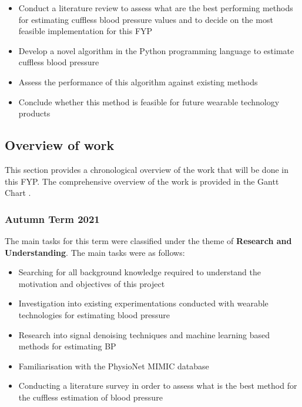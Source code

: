 \begin{itemize}
    \item Conduct a literature review to assess what are the best performing methods for estimating cuffless blood pressure values and to decide on the most feasible implementation for this FYP
    \item Develop a novel algorithm in the Python programming language to estimate cuffless blood pressure
    \item Assess the performance of this algorithm against existing methods
    \item Conclude whether this method is feasible for future wearable technology products
\end{itemize}

\subsection{Overview of work}
This section provides a chronological overview of the work that will be done in this FYP. The comprehensive overview 
of the work is provided in the Gantt Chart \cite{Gantt}.

\subsubsection{Autumn Term 2021}
The main tasks for this term were classified under the theme of \textbf{Research and Understanding}. The main tasks were as follows:
\begin{itemize}
    \item Searching for all background knowledge required to understand the motivation and objectives of this project
    \item Investigation into existing experimentations conducted with wearable technologies for estimating blood pressure
    \item Research into signal denoising techniques and machine learning based methods for estimating BP
    \item Familiarisation with the PhysioNet MIMIC database
    \item Conducting a literature survey in order to assess what is the best method for the cuffless estimation of blood pressure
\end{itemize}

